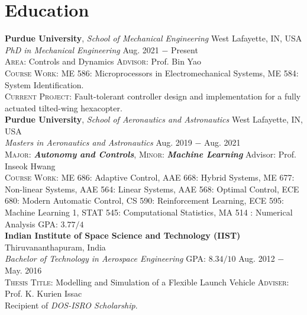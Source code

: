 \documentclass[letterpaper,10pt]{article}
\begin{document}
\section{Education}
\noindent \textbf{Purdue University}, \textit{School of Mechanical Engineering} \hfill West Lafayette, IN, USA \\
\textit{PhD in Mechanical Engineering} \hfill Aug. 2021 $-$ Present\\
\textsc{Area}: Controls and Dynamics \hfill \textsc{Advisor}: Prof. Bin Yao\\
\textsc{Course Work:} ME 586: Microprocessors in Electromechanical Systems, ME 584: System Identification.\\
\textsc{Current Project}: Fault-tolerant controller design and implementation for a fully actuated tilted-wing hexacopter.\\

\vspace{5pt}
\noindent \textbf{Purdue University}, \textit{School of Aeronautics and Astronautics} \hfill West Lafayette, IN, USA \\
\textit{Masters in Aeronautics and Astronautics} \hfill Aug. 2019 $-$ Aug. 2021\\
\textsc{Major}: \textit{\textbf{Autonomy and Controls}}, \textsc{Minor}: \textit{\textbf{Machine Learning}}
\hfill Advisor: Prof. Inseok Hwang\\
\textsc{Course Work}: ME 686: Adaptive Control, AAE 668: Hybrid Systems, ME 677: Non-linear Systems, AAE 564: Linear Systems,  AAE 568: Optimal Control, ECE 680: Modern Automatic Control, CS 590: Reinforcement Learning, ECE 595: Machine Learning 1, STAT 545: Computational Statistics, MA 514 : Numerical Analysis
\hfill \textsc{GPA}: $3.77/4$\\


\vspace{5pt}
\noindent \textbf{Indian Institute of Space Science and Technology (IIST)} \hfill Thiruvananthapuram, India\\
\textit{Bachelor of Technology in Aerospace Engineering} \hfill \textsc{GPA}: $8.34/10$ \hfill Aug. 2012 $-$ May. 2016 \\
\textsc{Thesis Title}: Modelling and Simulation of a Flexible Launch Vehicle
\hfill \textsc{Adviser}: Prof. K. Kurien Issac \\
Recipient of \textit{DOS-ISRO Scholarship}.
\end{document}
